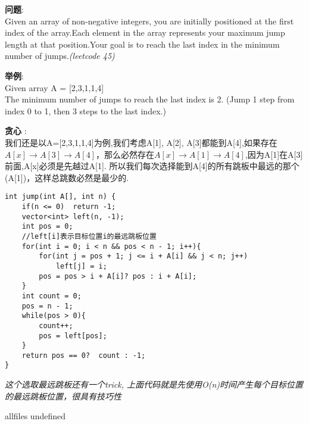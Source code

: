 \documentclass{article}
\begin{document}
\begin{CJK}{UTF8}{gbsn}     %

\else
    
\begin{description}
    \item{\textbf{问题}}:\\
Given an array of non-negative integers, you are initially positioned at the first index of the array.Each element in the array represents your maximum jump length at that position.Your goal is to reach the last index in the minimum number of jumps.\textit{(leetcode 45)}

    \item{\textbf{举例}}:\\
Given array A = [2,3,1,1,4]\\
The minimum number of jumps to reach the last index is 2. (Jump 1 step from index 0 to 1, then 3 steps to the last index.)
    \item{\textbf{贪心}} : 
    \\我们还是以A=[2,3,1,1,4]为例,我们考虑A[1], A[2], A[3]都能到A[4],如果存在$A[x] \rightarrow A[3] \rightarrow A[4]$，那么必然存在$A[x] \rightarrow A[1] \rightarrow A[4]$,因为A[1]在A[3]前面,A[x]必须是先越过A[1]. 所以我们每次选择能到A[4]的所有跳板中最远的那个(A[1])，这样总跳数必然是最少的.
    \begin{lstlisting}
int jump(int A[], int n) {
	if(n <= 0)	return -1;
	vector<int> left(n, -1);
	int pos = 0;
	//left[i]表示目标位置i的最远跳板位置
	for(int i = 0; i < n && pos < n - 1; i++){
		for(int j = pos + 1; j <= i + A[i] && j < n; j++)
			left[j] = i;
		pos = pos > i + A[i]? pos : i + A[i];
	}
	int count = 0;
	pos = n - 1;
	while(pos > 0){
		count++;
		pos = left[pos];
	}
	return pos == 0?  count : -1;
}
    \end{lstlisting}
    \textit{这个选取最远跳板还有一个trick, 上面代码就是先使用O(n)时间产生每个目标位置的最远跳板位置，很具有技巧性}
\end{description}

\fi

\ifx allfiles undefined
\end{CJK}
\end{document}
